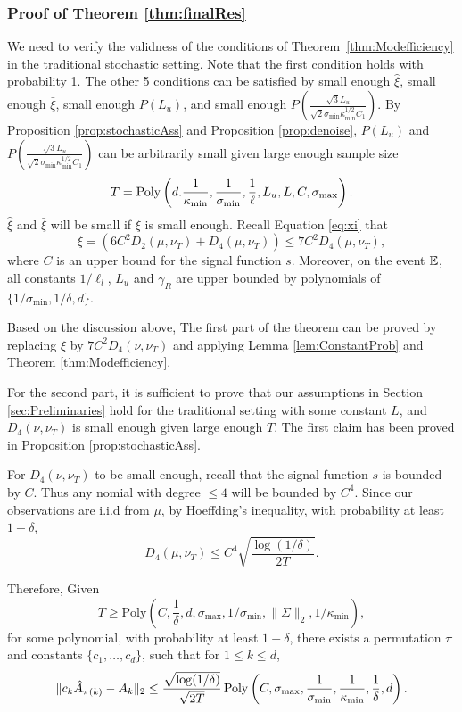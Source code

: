 \subsubsection{Proof of Theorem \ref{thm:finalRes}}
We need to verify the validness of the conditions of Theorem~\ref{thm:Modefficiency} in the traditional stochastic setting. 
Note that the first condition holds with probability 1. 
The other 5 conditions can be satisfied by small enough 
$\hat{\xi}$, small enough $\bar{\xi}$, small enough $P(L_u)$, and small enough $P\left(\frac{\sqrt{3}L_u}{\sqrt{2}\sigma_{\min}\kappa_{\min}^{1/2}C_1}\right)$.
By Proposition \ref{prop:stochasticAss} and Proposition \ref{prop:denoise}, $P(L_u)$ and $P\left(\frac{\sqrt{3}L_u}{\sqrt{2}\sigma_{\min}\kappa_{\min}^{1/2}C_1}\right)$ can be arbitrarily small given large enough sample size 
\[T = \operatorname{Poly}\left(d.\frac{1}{\kappa_{\min}}, \frac{1}{\sigma_{\min}}, \frac{1}{\ell}, L_u, L, C, \sigma_{\max}\right).\] 
$\hat{\xi}$ and $\bar{\xi}$ will be small if $\xi$ is small enough.
Recall Equation \eqref{eq:xi} that 
\[\xi = \left( 6C^2D_2(\mu, \nu_T) + D_4(\mu, \nu_T)\right) \le 7C^2D_4(\mu, \nu_T),\]
where $C$ is an upper bound for the signal function $s$.
Moreover, on the event $\mathbb{E}$, all constants $1/\ell_l$, $L_u$ and $\gamma_R$ are upper bounded by polynomials of $\{ 1/\sigma_{\min}, 1/\delta, d\}$. 

Based on the discussion above, The first part of the theorem can be proved by replacing $\xi$ by $7C^2D_4(\nu,\nu_T)$ and applying Lemma \ref{lem:ConstantProb} and Theorem \ref{thm:Modefficiency}. 

For the second part, it is sufficient to prove that our assumptions in Section \ref{sec:Preliminaries} hold for the traditional setting with some constant $L$, and $D_4(\nu, \nu_T)$ is small enough given large enough $T$.
The first claim has been proved in Proposition \ref{prop:stochasticAss}. 

For $D_4(\nu, \nu_T)$ to be small enough, recall that the signal function $s$ is bounded by $C$. 
Thus any nomial with degree $\le 4$ will be bounded by $C^4$. Since our observations are i.i.d from $\mu$, by Hoeffding's inequality, with probability at least $1-\delta$, 
\[
D_4(\mu, \nu_T) \le  C^4\sqrt{\frac{\log(1/\delta)}{2T}}.
\]

Therefore, Given 
\[
T \ge \text{Poly}\left(C, \frac{1}{\delta}, d,  \sigma_{\max}, 1/\sigma_{\min}, \|\Sigma\|_2, 1/\kappa_{\min}\right),
\]
for some polynomial, with probability at least $1-\delta$, there exists a permutation $\pi$ and constants $\{c_1,\ldots,c_d\}$, such that for $1\le k\le d$,
\[
\| c_k\hat{A}_{\pi(k)} - A_k\|_2 \le \frac{\sqrt{\log(1/\delta)}}{\sqrt{2T}}\operatorname{Poly}\left(C, \sigma_{\max}, \frac{1}{\sigma_{\min}}, \frac{1}{\kappa_{\min}},\frac{1}{\delta}, d\right).
\]


